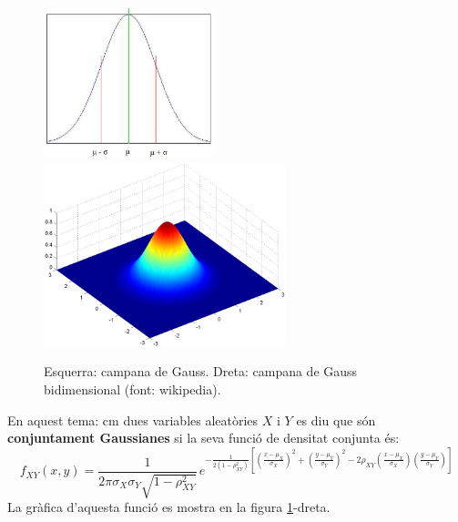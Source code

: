 \documentclass{article}
\begin{document}
\begin{figure}[htbp]
\begin{center}
\includegraphics[width=5cm]{normalpdf.png} 
$\qquad \qquad$
\includegraphics[width=7cm]{786px-Gaussian_2d.png}
\caption{Esquerra: campana de Gauss. Dreta: campana de Gauss bidimensional (font: wikipedia).}
\label{campanaGauss}
\end{center}
\end{figure}



\newpage
\noindent
En aquest tema:
 cm
dues variables aleat\`ories $X$ i $Y$ es diu que s\'on \textbf{conjuntament Gaussianes} si la seva funci\'o de
densitat conjunta \'es:
\[
f_{XY}(x, y)=\frac{1}{2 \pi \sigma_X \sigma_Y \sqrt{1-\rho_{XY}^2}} \,
e^{- \frac{1}{2(1-\rho_{XY}^2)} \left[ (\frac{x-\mu_X}{\sigma_X})^2 + (\frac{y-\mu_Y}{\sigma_Y})^2 - 
2 \rho_{XY} (\frac{x-\mu_X}{\sigma_X}) (\frac{y-\mu_Y}{\sigma_Y}) \right]}
\]
\noindent
La gr\`afica d'aquesta funci\'o es mostra en la figura \ref{campanaGauss}-dreta.
\end{document}
